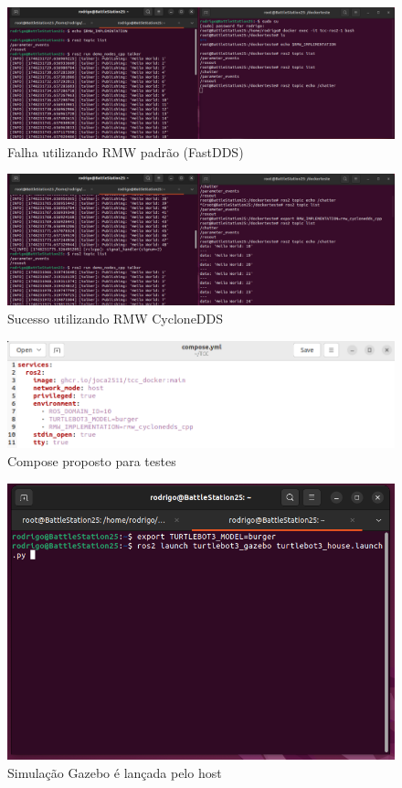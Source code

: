 \begin{figure}[htb]
    \centering
    \includegraphics[width=1\linewidth]{Figures/TestePadraoFalha.png}
    \caption{Falha utilizando RMW padrão (FastDDS)}
    \label{fig:enter-label}
\end{figure}
\begin{figure}[htb]
    \centering
    \includegraphics[width=1\linewidth]{Figures/TesteCycloneSucesso.png}
    \caption{Sucesso utilizando RMW CycloneDDS }
    \label{fig:enter-label}
\end{figure}
\begin{figure}[htb]
    \centering
    \includegraphics[width=1\linewidth]{Figures/ComposeFinal.png}
    \caption{Compose proposto para testes}
    \label{fig:enter-label}
\end{figure}
\begin{figure}[htb]
    \centering
    \includegraphics[width=1\linewidth]{Figures/SimulacaoGazeboLancada.png}
    \caption{Simulação Gazebo é lançada pelo host}
    \label{fig:enter-label}
\end{figure}
